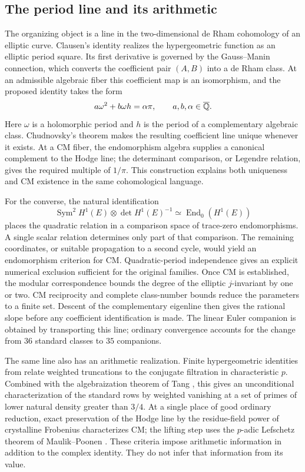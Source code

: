 \subsection{The period line and its arithmetic}
The organizing object is a line in the two-dimensional de Rham
cohomology of an elliptic curve. Clausen's identity realizes the
hypergeometric function as an elliptic period square. Its first
derivative is governed by the Gauss--Manin connection, which converts
the coefficient pair $(A,B)$ into a de Rham class. At an admissible
algebraic fiber this coefficient map is an isomorphism, and the
proposed identity takes the form
\[
 a\omega^2+b\omega h=\alpha\pi,
 \qquad a,b,\alpha\in\overline{\mathbb Q}.
\]
Here $\omega$ is a holomorphic period and $h$ is the period of a
complementary algebraic class. Chudnovsky's theorem makes the resulting
coefficient line unique whenever it exists. At a CM fiber, the
endomorphism algebra supplies a canonical complement to the Hodge
line; the determinant comparison, or Legendre relation, gives the
required multiple of $1/\pi$. This construction explains both
uniqueness and CM existence in the same cohomological language.

For the converse, the natural identification
\[
 \operatorname{Sym}^2 H^1(E)\otimes\det H^1(E)^{-1}
       \simeq\operatorname{End}_0(H^1(E))
\]
places the quadratic relation in a comparison space of trace-zero
endomorphisms. A single scalar relation determines only part of that
comparison. The remaining coordinates, or suitable propagation to a
second cycle, would yield an endomorphism criterion for CM.
Quadratic-period independence gives an explicit numerical exclusion
sufficient for the original families. Once CM is established,
the modular correspondence bounds the degree of the elliptic
$j$-invariant by one or two. CM reciprocity \cite{CoxCM} and complete
class-number bounds \cite{Watkins} reduce the parameters to a finite
set. Descent of the complementary eigenline then gives the rational
slope before any coefficient identification is made. The linear Euler
companion is obtained by transporting this line; ordinary convergence
accounts for the change from $36$ standard classes to $35$ companions.

The same line also has an arithmetic realization. Finite
hypergeometric identities from \cite{BRSTT} relate weighted
truncations to the conjugate filtration in characteristic $p$.
Combined with the algebraization theorem of Tang \cite{Tang}, this
gives an unconditional characterization of the standard rows by
weighted vanishing at a set of primes of lower natural density
greater than $3/4$. At a single place of good ordinary reduction,
exact preservation of the Hodge line by the residue-field power of
crystalline Frobenius characterizes CM; the lifting step uses the
$p$-adic Lefschetz theorem of Maulik--Poonen \cite{MaulikPoonen}.
These criteria impose arithmetic information in addition to the
complex identity. They do not infer that information from its value.

